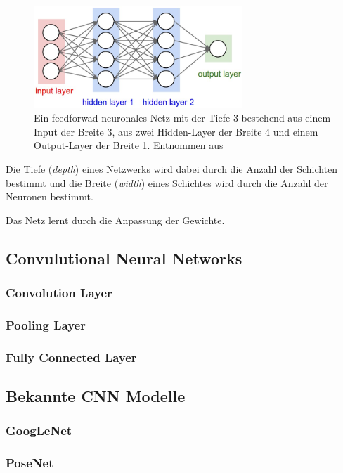 \begin{figure}
	\centering
	\includegraphics[width=0.7\textwidth]{images/neural_net.jpeg}
	\caption{Ein feedforwad neuronales Netz mit der Tiefe 3 bestehend aus einem Input der Breite 3, aus zwei Hidden-Layer der Breite 4 und einem Output-Layer der Breite 1. Entnommen aus \cite{CS231nConvolutionalNeural}}
	\label{fig:neural_net}
\end{figure}


Die Tiefe (\textit{depth}) eines Netzwerks wird dabei durch die Anzahl der Schichten bestimmt und die Breite (\textit{width}) eines Schichtes wird durch die Anzahl der Neuronen  bestimmt\cite{Goodfellow-et-al-2016}.

Das Netz lernt durch die Anpassung der Gewichte.
\subsection{Convulutional Neural Networks}
\subsubsection{Convolution Layer}
\subsubsection{Pooling Layer}
\subsubsection{Fully Connected Layer}
\subsection{Bekannte CNN Modelle}
\subsubsection{GoogLeNet}
\subsubsection{PoseNet}

\pagebreak